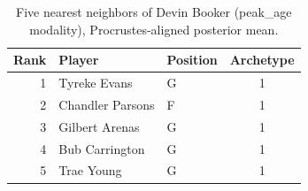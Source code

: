 \begin{table}[htbp]
  \centering\small
  \begin{tabular}{rllc}
    \toprule
    Rank & Player & Position & Archetype \\
    \midrule
    1 & Tyreke Evans & G & 1 \\
    2 & Chandler Parsons & F & 1 \\
    3 & Gilbert Arenas & G & 1 \\
    4 & Bub Carrington & G & 1 \\
    5 & Trae Young & G & 1 \\
    \bottomrule
  \end{tabular}
  \caption{Five nearest neighbors of Devin Booker (peak_age modality), Procrustes-aligned posterior mean.}
  \label{tab:Devin_Booker_neighbors_peak_age}
\end{table}

